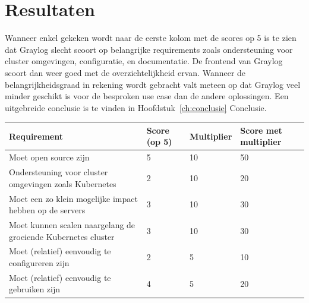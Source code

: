 \section{Resultaten}

Wanneer enkel gekeken wordt naar de eerste kolom met de scores op 5 is te zien dat Graylog slecht scoort op belangrijke requirements zoals ondersteuning voor cluster omgevingen, configuratie, en documentatie. De frontend van Graylog scoort dan weer goed met de overzichtelijkheid ervan. Wanneer de belangrijkheidsgraad in rekening wordt gebracht valt meteen op dat Graylog veel minder geschikt is voor de besproken use case dan de andere oplossingen. Een uitgebreide conclusie is te vinden in Hoofdstuk~\ref{ch:conclusie} Conclusie.

\begin{table}[]
    \begin{tabular}{| m{20em} | m{2cm} | m{2cm} | m{2cm} | }
        \hline
        \textbf{Requirement}                                                                                              & \textbf{Score (op 5)} & \textbf{Multiplier} & \textbf{Score met multiplier} \\ \hline
        Moet open source zijn                                                                                             & 5                     & 10                  & 50                            \\ \hline
        Ondersteuning voor cluster omgevingen zoals Kubernetes                                                            & 2                     & 10                  & 20                            \\ \hline
        Moet een zo klein mogelijke impact hebben op de servers                                                           & 3                     & 10                  & 30                            \\ \hline
        Moet kunnen scalen naargelang de groeiende Kubernetes cluster                                                     & 3                     & 10                  & 30                            \\ \hline
        Moet (relatief) eenvoudig te configureren zijn                                                                    & 2                     & 5                   & 10                            \\ \hline
        Moet (relatief) eenvoudig te gebruiken zijn                                                                       & 4                     & 5                   & 20                            \\ \hline

\end{tabular}
\end{table}
